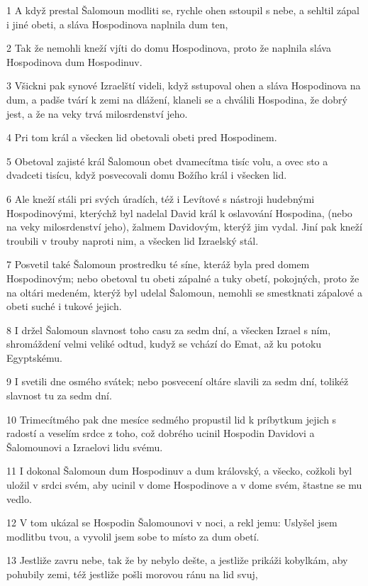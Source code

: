 \par 1 A když prestal Šalomoun modliti se, rychle ohen sstoupil s nebe, a sehltil zápal i jiné obeti, a sláva Hospodinova naplnila dum ten,
\par 2 Tak že nemohli kneží vjíti do domu Hospodinova, proto že naplnila sláva Hospodinova dum Hospodinuv.
\par 3 Všickni pak synové Izraelští videli, když sstupoval ohen a sláva Hospodinova na dum, a padše tvárí k zemi na dlážení, klaneli se a chválili Hospodina, že dobrý jest, a že na veky trvá milosrdenství jeho.
\par 4 Pri tom král a všecken lid obetovali obeti pred Hospodinem.
\par 5 Obetoval zajisté král Šalomoun obet dvamecítma tisíc volu, a ovec sto a dvadceti tisícu, když posvecovali domu Božího král i všecken lid.
\par 6 Ale kneží stáli pri svých úradích, též i Levítové s nástroji hudebnými Hospodinovými, kterýchž byl nadelal David král k oslavování Hospodina, (nebo na veky milosrdenství jeho), žalmem Davidovým, kterýž jim vydal. Jiní pak kneží troubili v trouby naproti nim, a všecken lid Izraelský stál.
\par 7 Posvetil také Šalomoun prostredku té síne, kteráž byla pred domem Hospodinovým; nebo obetoval tu obeti zápalné a tuky obetí, pokojných, proto že na oltári medeném, kterýž byl udelal Šalomoun, nemohli se smestknati zápalové a obeti suché i tukové jejich.
\par 8 I držel Šalomoun slavnost toho casu za sedm dní, a všecken Izrael s ním, shromáždení velmi veliké odtud, kudyž se vchází do Emat, až ku potoku Egyptskému.
\par 9 I svetili dne osmého svátek; nebo posvecení oltáre slavili za sedm dní, tolikéž slavnost tu za sedm dní.
\par 10 Trimecítmého pak dne mesíce sedmého propustil lid k príbytkum jejich s radostí a veselím srdce z toho, což dobrého ucinil Hospodin Davidovi a Šalomounovi a Izraelovi lidu svému.
\par 11 I dokonal Šalomoun dum Hospodinuv a dum královský, a všecko, cožkoli byl uložil v srdci svém, aby ucinil v dome Hospodinove a v dome svém, štastne se mu vedlo.
\par 12 V tom ukázal se Hospodin Šalomounovi v noci, a rekl jemu: Uslyšel jsem modlitbu tvou, a vyvolil jsem sobe to místo za dum obetí.
\par 13 Jestliže zavru nebe, tak že by nebylo dešte, a jestliže prikáži kobylkám, aby pohubily zemi, též jestliže pošli morovou ránu na lid svuj,
